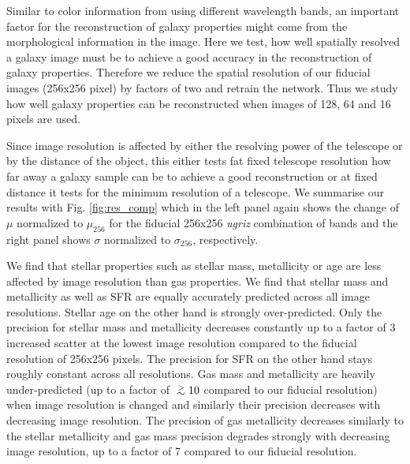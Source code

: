 \documentclass[useAMS,usenatbib]{mnras}
\newcommand{\gtsima}{$\; \buildrel > \over \sim \;$}
\newcommand{\gsim}{\lower.5ex\hbox{\gtsima}}
\begin{document}
Similar to color information from using different wavelength bands, an important factor for the reconstruction of galaxy properties might come from the morphological information in the image. 
Here we test, how well spatially resolved a galaxy image must be to achieve a good accuracy in the reconstruction of galaxy properties. Therefore we reduce the spatial resolution of our fiducial images (256x256 pixel) by factors of two and retrain the network. Thus we study how well galaxy properties can be reconstructed when images of 128, 64 and 16 pixels are used. 

Since image resolution is affected by either the resolving power of the telescope or by the distance of the object, this either tests fat fixed telescope resolution how far away a galaxy sample can be to achieve a good reconstruction or at fixed distance it tests for the minimum resolution of a telescope.
We summarise our results with Fig. \ref{fig:res_comp} which in the left panel again shows the change of $\mu$ normalized to $\mu_{256}$ for the fiducial 256x256 \emph{ugriz} combination of bands and the right panel shows $\sigma$ normalized to $\sigma_{256}$, respectively. 

We find that stellar properties such as stellar mass, metallicity or age are less affected by image resolution than gas properties. We find that stellar mass and metallicity as well as SFR are equally accurately predicted across all image resolutions. Stellar age on the other hand is strongly over-predicted. Only the precision for stellar mass and metallicity decreases constantly up to a factor of 3 increased scatter at the lowest image resolution compared to the fiducial resolution of 256x256 pixels. The precision for SFR on the other hand stays roughly constant across all resolutions. Gas mass and metallicity are heavily under-predicted (up to a factor of $\gsim10$ compared to our fiducial resolution) when image resolution is changed and similarly their precision decreases with decreasing image resolution. The precision of gas metallicity decreases similarly to the stellar metallicity and gas mass precision degrades strongly with decreasing image resolution, up to a factor of 7 compared to our fiducial resolution.
\end{document}
